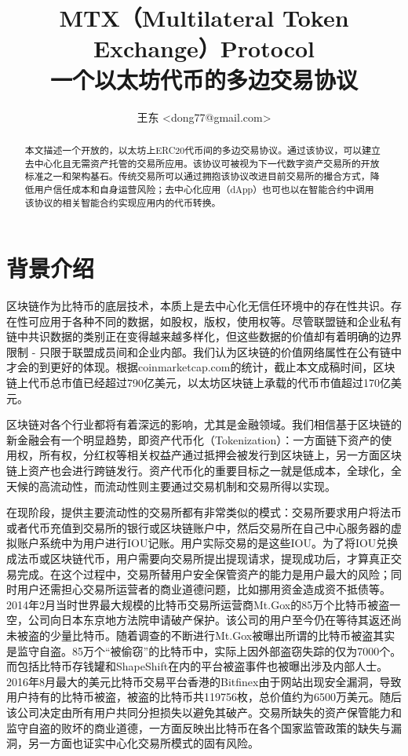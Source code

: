 \documentclass[UTF8,nofonts]{ctexart}
\title{MTX（Multilateral Token Exchange）Protocol\\一个以太坊代币的多边交易协议}
\author{
    王东 <dong77@gmail.com>
}
\begin{document}
\maketitle

\begin{abstract}
本文描述一个开放的，以太坊上ERC20代币间的多边交易协议。通过该协议，可以建立去中心化且无需资产托管的交易所应用。该协议可被视为下一代数字资产交易所的开放标准之一和架构基石。传统交易所可以通过拥抱该协议改进目前交易所的撮合方式，降低用户信任成本和自身运营风险；去中心化应用（dApp）也可也以在智能合约中调用该协议的相关智能合约实现应用内的代币转换。

\end{abstract}

\section{背景介绍\label{sec:background}}

区块链作为比特币的底层技术，本质上是去中心化无信任环境中的存在性共识。存在性可应用于各种不同的数据，如股权，版权，使用权等。尽管联盟链和企业私有链中共识数据的类别正在变得越来越多样化，但这些数据的价值却有着明确的边界限制 - 只限于联盟成员间和企业内部。我们认为区块链的价值网络属性在公有链中才会的到更好的体现。根据coinmarketcap.com的统计，截止本文成稿时间，区块链上代币总市值已经超过790亿美元，以太坊区块链上承载的代币市值超过170亿美元。

区块链对各个行业都将有着深远的影响，尤其是金融领域。我们相信基于区块链的新金融会有一个明显趋势，即资产代币化（Tokenization）：一方面链下资产的使用权，所有权，分红权等相关权益产通过抵押会被发行到区块链上，另一方面区块链上资产也会进行跨链发行。资产代币化的重要目标之一就是低成本，全球化，全天候的高流动性，而流动性则主要通过交易机制和交易所得以实现。

在现阶段，提供主要流动性的交易所都有非常类似的模式：交易所要求用户将法币或者代币充值到交易所的银行或区块链账户中，然后交易所在自己中心服务器的虚拟账户系统中为用户进行IOU记账。用户实际交易的是这些IOU。为了将IOU兑换成法币或区块链代币，用户需要向交易所提出提现请求，提现成功后，才算真正交易完成。在这个过程中，交易所替用户安全保管资产的能力是用户最大的风险；同时用户还需担心交易所运营者的商业道德问题，比如挪用资金造成资不抵债等。2014年2月当时世界最大规模的比特币交易所运营商Mt.Gox的85万个比特币被盗一空，公司向日本东京地方法院申请破产保护。该公司的用户至今仍在等待其返还尚未被盗的少量比特币。随着调查的不断进行Mt.Gox被曝出所谓的比特币被盗其实是监守自盗。85万个“被偷窃”的比特币中，实际上因外部盗窃失踪的仅为7000个。而包括比特币存钱罐和ShapeShift在内的平台被盗事件也被曝出涉及内部人士。2016年8月最大的美元比特币交易平台香港的Bitfinex由于网站出现安全漏洞，导致用户持有的比特币被盗，被盗的比特币共119756枚，总价值约为6500万美元。随后该公司决定由所有用户共同分担损失以避免其破产。交易所缺失的资产保管能力和监守自盗的败坏的商业道德，一方面反映出比特币在各个国家监管政策的缺失与漏洞，另一方面也证实中心化交易所模式的固有风险。
\end{document}
